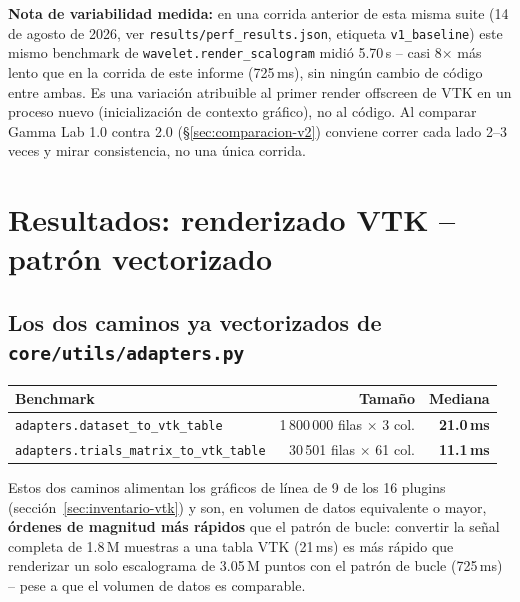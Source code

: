 \documentclass[11pt,a4paper]{article}
\begin{document}
\textbf{Nota de variabilidad medida:} en una corrida anterior de esta misma suite (14 de agosto de 2026, ver
\texttt{results/perf\_\allowbreak results.json}, etiqueta \texttt{v1\_\allowbreak baseline}) este mismo
benchmark de \texttt{wavelet.render\_\allowbreak scalogram} midió 5.70\,s -- casi 8$\times$ más lento que en
la corrida de este informe (725\,ms), sin ningún cambio de código entre ambas. Es una variación atribuible al
primer render offscreen de VTK en un proceso nuevo (inicialización de contexto gráfico), no al código. Al
comparar Gamma Lab 1.0 contra 2.0 (\S\ref{sec:comparacion-v2}) conviene correr cada lado 2--3 veces y mirar
consistencia, no una única corrida.

\section{Resultados: renderizado VTK -- patrón vectorizado}
\label{sec:resultados-render-vectorizado}

\subsection{Los dos caminos ya vectorizados de \texttt{core/utils/adapters.py}}

\begin{center}
\begin{tabular}{lrr}
\toprule
\textbf{Benchmark} & \textbf{Tamaño} & \textbf{Mediana} \\
\midrule
\texttt{adapters.dataset\_\allowbreak to\_\allowbreak vtk\_\allowbreak table} & 1\,800\,000 filas $\times$ 3 col. & \textbf{21.0\,ms} \\
\texttt{adapters.trials\_\allowbreak matrix\_\allowbreak to\_\allowbreak vtk\_\allowbreak table} & 30\,501 filas $\times$ 61 col. & \textbf{11.1\,ms} \\
\bottomrule
\end{tabular}
\end{center}

Estos dos caminos alimentan los gráficos de línea de 9 de los 16 plugins (sección~\ref{sec:inventario-vtk}) y
son, en volumen de datos equivalente o mayor, \textbf{órdenes de magnitud más rápidos} que el patrón de
bucle: convertir la señal completa de 1.8\,M muestras a una tabla VTK (21\,ms) es más rápido que renderizar un
solo escalograma de 3.05\,M puntos con el patrón de bucle (725\,ms) -- pese a que el volumen de datos es
comparable.
\end{document}
